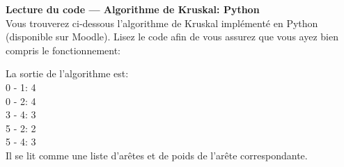 \begin{Exercice}[30 minutes] \textbf{Lecture du code — Algorithme de Kruskal\!: Python}\\
    Vous trouverez ci-dessous l'algorithme de Kruskal implémenté en Python (disponible sur Moodle). Lisez le code afin de vous assurez que vous ayez bien compris le fonctionnement\!:\\
    
    \begin{conseil}
        La sortie de l'algorithme est\!: \\
        0 - 1: 4 \\ 
        0 - 2: 4 \\
        3 - 4: 3 \\
        5 - 2: 2 \\ 
        5 - 4: 3 \\
        Il se lit comme une liste d'arêtes et de poids de l'arête correspondante.
    \end{conseil}
\end{Exercice}


